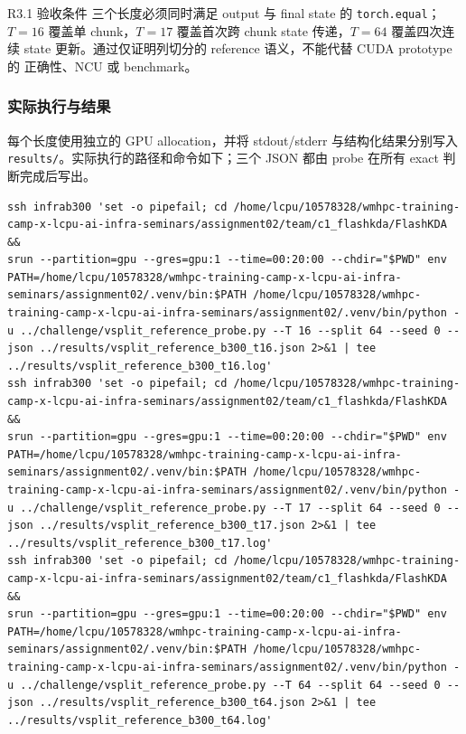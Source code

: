 \documentclass[11pt,a4paper,fontset=none]{ctexart}
\newcommand{\code}[1]{\texttt{#1}}
\begin{document}
\begin{record}{R3.1 验收条件}
三个长度必须同时满足 output 与 final state 的 \code{torch.equal}；\(T=16\)
覆盖单 chunk，\(T=17\) 覆盖首次跨 chunk state 传递，\(T=64\) 覆盖四次连续
state 更新。通过仅证明列切分的 reference 语义，不能代替 CUDA prototype 的
正确性、NCU 或 benchmark。
\end{record}

\subsubsection{实际执行与结果}

每个长度使用独立的 GPU allocation，并将 stdout/stderr 与结构化结果分别写入
\code{results/}。实际执行的路径和命令如下；三个 JSON 都由 probe 在所有 exact
判断完成后写出。

\begin{lstlisting}
ssh infrab300 'set -o pipefail; cd /home/lcpu/10578328/wmhpc-training-camp-x-lcpu-ai-infra-seminars/assignment02/team/c1_flashkda/FlashKDA &&
srun --partition=gpu --gres=gpu:1 --time=00:20:00 --chdir="$PWD" env PATH=/home/lcpu/10578328/wmhpc-training-camp-x-lcpu-ai-infra-seminars/assignment02/.venv/bin:$PATH /home/lcpu/10578328/wmhpc-training-camp-x-lcpu-ai-infra-seminars/assignment02/.venv/bin/python -u ../challenge/vsplit_reference_probe.py --T 16 --split 64 --seed 0 --json ../results/vsplit_reference_b300_t16.json 2>&1 | tee ../results/vsplit_reference_b300_t16.log'
ssh infrab300 'set -o pipefail; cd /home/lcpu/10578328/wmhpc-training-camp-x-lcpu-ai-infra-seminars/assignment02/team/c1_flashkda/FlashKDA &&
srun --partition=gpu --gres=gpu:1 --time=00:20:00 --chdir="$PWD" env PATH=/home/lcpu/10578328/wmhpc-training-camp-x-lcpu-ai-infra-seminars/assignment02/.venv/bin:$PATH /home/lcpu/10578328/wmhpc-training-camp-x-lcpu-ai-infra-seminars/assignment02/.venv/bin/python -u ../challenge/vsplit_reference_probe.py --T 17 --split 64 --seed 0 --json ../results/vsplit_reference_b300_t17.json 2>&1 | tee ../results/vsplit_reference_b300_t17.log'
ssh infrab300 'set -o pipefail; cd /home/lcpu/10578328/wmhpc-training-camp-x-lcpu-ai-infra-seminars/assignment02/team/c1_flashkda/FlashKDA &&
srun --partition=gpu --gres=gpu:1 --time=00:20:00 --chdir="$PWD" env PATH=/home/lcpu/10578328/wmhpc-training-camp-x-lcpu-ai-infra-seminars/assignment02/.venv/bin:$PATH /home/lcpu/10578328/wmhpc-training-camp-x-lcpu-ai-infra-seminars/assignment02/.venv/bin/python -u ../challenge/vsplit_reference_probe.py --T 64 --split 64 --seed 0 --json ../results/vsplit_reference_b300_t64.json 2>&1 | tee ../results/vsplit_reference_b300_t64.log'
\end{lstlisting}
\end{document}
